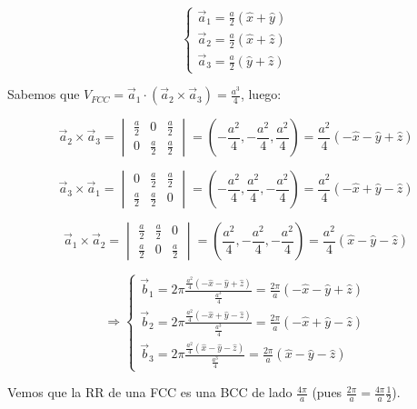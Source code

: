 \documentclass[a4paper]{article}
\begin{document}
\begin{itemize}
$$\begin{cases}
\vec{a}_{1} = \frac{a}{2}(\hat{x} + \hat{y}) \\
\vec{a}_{2} = \frac{a}{2}(\hat{x} + \hat{z}) \\
\vec{a}_{3} = \frac{a}{2}(\hat{y} + \hat{z})
\end{cases}$$

Sabemos que $V_{FCC} = \vec{a}_{1} \cdot (\vec{a}_{2} \times \vec{a}_{3}) = \frac{a^{3}}{4}$, luego:

$$ \vec{a}_{2} \times \vec{a}_{3} = \begin{vmatrix}
\frac{a}{2} & 0 & \frac{a}{2} \\ 
0 & \frac{a}{2} & \frac{a}{2}
\end{vmatrix}  = (-\frac{a^{2}}{4}, -\frac{a^{2}}{4}, \frac{a^{2}}{4}) = \frac{a^{2}}{4}(-\hat{x} - \hat{y} + \hat{z})$$

$$ \vec{a}_{3} \times \vec{a}_{1} = \begin{vmatrix}
0 & \frac{a}{2} & \frac{a}{2} \\
\frac{a}{2} & \frac{a}{2} & 0
\end{vmatrix}  = (-\frac{a^{2}}{4}, \frac{a^{2}}{4}, -\frac{a^{2}}{4}) = \frac{a^{2}}{4}(-\hat{x} + \hat{y} - \hat{z})$$

$$ \vec{a}_{1} \times \vec{a}_{2} = \begin{vmatrix}
\frac{a}{2} & \frac{a}{2} & 0 \\ 
\frac{a}{2} & 0 & \frac{a}{2}
\end{vmatrix}  = (\frac{a^{2}}{4}, -\frac{a^{2}}{4}, -\frac{a^{2}}{4}) = \frac{a^{2}}{4}(\hat{x} - \hat{y} - \hat{z})$$

$$\Rightarrow \begin{cases}
\vec{b}_{1} = 2\pi \frac{\frac{a^{2}}{4}(-\hat{x} - \hat{y} + \hat{z})}{\frac{a^{3}}{4}} = \frac{2\pi}{a}(-\hat{x} - \hat{y} + \hat{z})\\
\vec{b}_{2} = 2\pi \frac{\frac{a^{2}}{4}(-\hat{x} + \hat{y} - \hat{z})}{\frac{a^{3}}{4}} = \frac{2\pi}{a}(-\hat{x} + \hat{y} - \hat{z})\\
\vec{b}_{3} = 2\pi \frac{\frac{a^{2}}{4}(\hat{x} - \hat{y} - \hat{z})}{\frac{a^{3}}{4}} = \frac{2\pi}{a}(\hat{x} - \hat{y} - \hat{z})
\end{cases}$$

Vemos que la RR de una FCC es una BCC de lado $\frac{4 \pi}{a}$ (pues $\frac{2 \pi}{a} = \frac{4 \pi}{a}\frac{1}{2}$).

\end{itemize}
\end{document}
